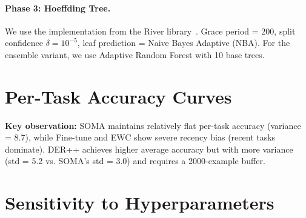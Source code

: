 \documentclass{article}
\begin{document}
\paragraph{Phase 3: Hoeffding Tree.}
We use the implementation from the River library~\citep{montiel2021river}.
Grace period = 200, split confidence $\delta = 10^{-5}$, leaf prediction = Naive Bayes Adaptive (NBA).
For the ensemble variant, we use Adaptive Random Forest with 10 base trees.

\section{Per-Task Accuracy Curves}
\label{app:curves}

\begin{table}[h]
\centering
\caption{\textbf{Per-task accuracy (\%)} on Split-CIFAR-100 after learning all 10 tasks. Each column shows accuracy on that task's test set.}
\label{tab:per_task}
\vspace{0.5em}
\end{table}

\textbf{Key observation:} SOMA maintains relatively flat per-task accuracy (variance = 8.7), while Fine-tune and EWC show severe recency bias (recent tasks dominate). DER++ achieves higher average accuracy but with more variance (std = 5.2 vs. SOMA's std = 3.0) and requires a 2000-example buffer.


\section{Sensitivity to Hyperparameters}
\label{app:sensitivity}
\end{document}
